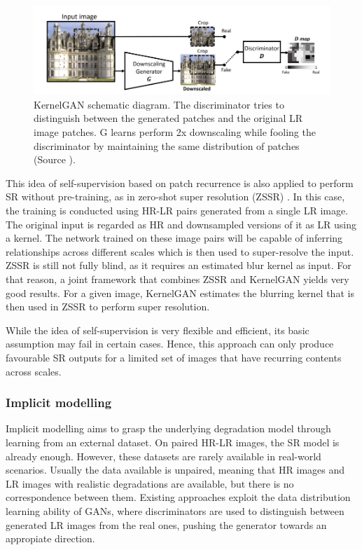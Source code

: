         \begin{figure}[H]
            \centering
            \includegraphics[width=\textwidth]{Includes/2-kernelGAN.png}
            \caption{KernelGAN schematic diagram. The discriminator tries to distinguish between the generated patches and the original LR image patches. G learns perform 2x downscaling while fooling the discriminator by maintaining the same distribution of patches (Source \cite{bellkligler2020blind}).}    
            \label{fig:2-kernelGAN}
        \end{figure}

        This idea of self-supervision based on patch recurrence is also applied to perform SR without pre-training, as in zero-shot super resolution (ZSSR) \cite{shocher2017zeroshot}.
        In this case, the training is conducted using HR-LR pairs generated from a single LR image.
        The original input is regarded as HR and downsampled versions of it as LR using a kernel. 
        The network trained on these image pairs will be capable of inferring relationships across different scales which is then used to super-resolve the input.
        ZSSR is still not fully blind, as it requires an estimated blur kernel as input. 
        For that reason, a joint framework that combines ZSSR and KernelGAN yields very good results.
        For a given image, KernelGAN estimates the blurring kernel that is then used in ZSSR to perform super resolution.

        While the idea of self-supervision is very flexible and efficient, its basic assumption may fail in certain cases.
        Hence, this approach can only produce favourable SR outputs for a limited set of images that have recurring contents across scales.



        \subsubsection{Implicit modelling} \label{subsubsec:implicit-modelling}

        Implicit modelling aims to grasp the underlying degradation model through learning from an external dataset.
        On paired HR-LR images, the SR model is already enough. However, these datasets are rarely available in real-world scenarios.
        Usually the data available is unpaired, meaning that HR images and LR images with realistic degradations are available, but there is no correspondence between them.
        Existing approaches exploit the data distribution learning ability of GANs, where discriminators are used to distinguish between generated LR images from the real ones, pushing the generator towards an appropiate direction.
        
